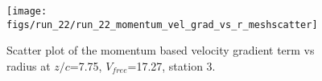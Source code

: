 \begin{figure}[H]
\centering
\texttt{[image: figs/run\_22/run\_22\_momentum\_vel\_grad\_vs\_r\_meshscatter]}
\caption{Scatter plot of the momentum based velocity gradient term vs radius at $z/c$=7.75, $V_{free}$=17.27, station 3.}
\label{fig:run_22_momentum_vel_grad_vs_r_meshscatter}
\end{figure}


